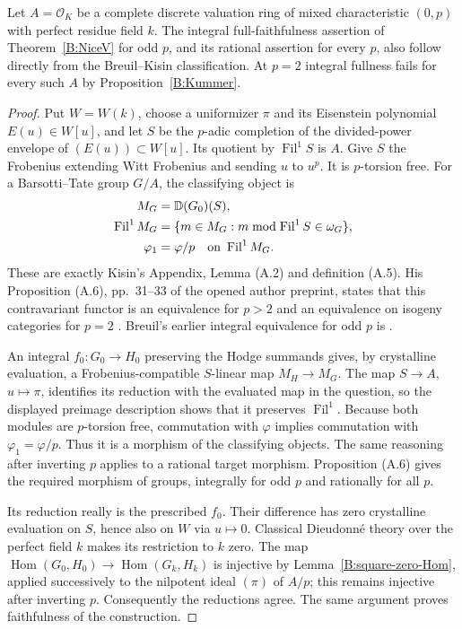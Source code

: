\begin{proposition}
\label{B:DVR-classification}
Let $A=\mathcal O_K$ be a complete discrete valuation ring of mixed
characteristic $(0,p)$ with perfect residue field $k$. The integral
full-faithfulness assertion of Theorem~\ref{B:NiceV} for odd $p$, and
its rational assertion for every $p$, also follow directly from the
Breuil--Kisin classification. At $p=2$ integral fullness fails for
every such $A$ by Proposition~\ref{B:Kummer}.
\end{proposition}
\begin{proof}
Put $W=W(k)$, choose a uniformizer $\pi$ and its Eisenstein polynomial
$E(u)\in W[u]$, and let $S$ be the $p$-adic completion of the
divided-power envelope of $(E(u))\subset W[u]$. Its quotient by
$\operatorname{Fil}^1 S$ is $A$. Give $S$ the Frobenius extending
Witt Frobenius and sending $u$ to $u^p$. It is $p$-torsion free.
For a Barsotti--Tate group $G/A$, the classifying object is
\begin{align*}
 M_G&=\mathbb D(G_0)(S),\\
 \operatorname{Fil}^1M_G&=
  \{m\in M_G:m\bmod\operatorname{Fil}^1S\in\omega_G\},\\
 \varphi_1&=\varphi/p\quad\hbox{on }\operatorname{Fil}^1M_G.
\end{align*}
These are exactly Kisin's Appendix, Lemma (A.2) and definition (A.5).
His Proposition (A.6), pp.~31--33 of the opened author preprint,
states that this contravariant functor is an equivalence for $p>2$
and an equivalence on isogeny categories for $p=2$
\cite{B:KisinCrystals}. Breuil's earlier integral equivalence for odd
$p$ is \cite[Theorem 4.2.2.9]{B:Breuil2000}.

An integral $f_0:G_0\to H_0$ preserving the Hodge summands gives,
by crystalline evaluation, a Frobenius-compatible $S$-linear map
$M_H\to M_G$. The map $S\to A$, $u\mapsto\pi$, identifies its
reduction with the evaluated map in the question, so the displayed
preimage description shows that it preserves
$\operatorname{Fil}^1$. Because both modules are $p$-torsion free,
commutation with $\varphi$ implies commutation with
$\varphi_1=\varphi/p$. Thus it is a morphism of the classifying
objects. The same reasoning after inverting $p$ applies to a rational
target morphism. Proposition (A.6) gives the required morphism of
groups, integrally for odd $p$ and rationally for all $p$.

Its reduction really is the prescribed $f_0$. Their difference has
zero crystalline evaluation on $S$, hence also on $W$ via $u\mapsto0$.
Classical Dieudonn\'e theory over the perfect field $k$ makes its
restriction to $k$ zero. The map
$\operatorname{Hom}(G_0,H_0)\to\operatorname{Hom}(G_k,H_k)$
is injective by Lemma~\ref{B:square-zero-Hom}, applied successively
to the nilpotent ideal $(\pi)$ of $A/p$; this remains injective
after inverting $p$. Consequently the reductions agree. The same
argument proves faithfulness of the construction.


\end{proof}
